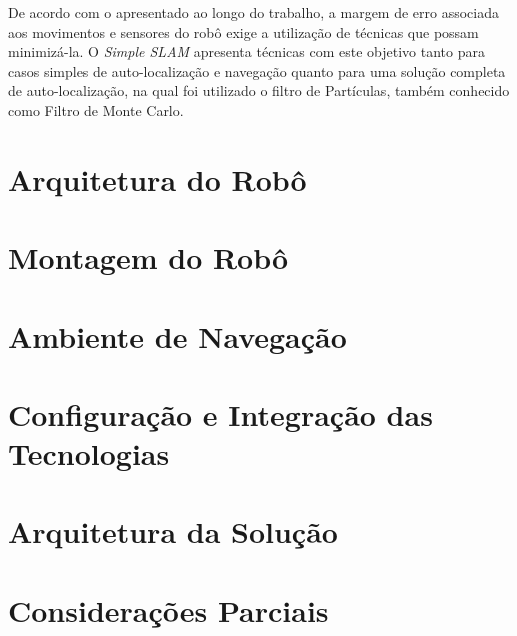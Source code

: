 	De acordo com o apresentado ao longo do trabalho, a margem de erro associada aos movimentos e sensores do robô exige a utilização de técnicas que possam minimizá-la. O \textit{Simple SLAM} apresenta técnicas com este objetivo tanto para casos simples de auto-localização e navegação quanto para uma solução completa de auto-localização, na qual foi utilizado o filtro de Partículas, também conhecido como Filtro de Monte Carlo.

\section{Arquitetura do Robô}


\section{Montagem do Robô}

\section{Ambiente de Navegação}

\section{Configuração e Integração das Tecnologias}

\section{Arquitetura da Solução}

\section{Considerações Parciais}